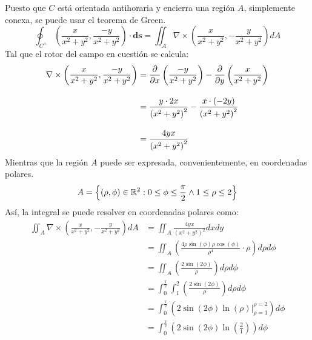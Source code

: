\begin{solution}
\begin{figure}[H]
    \end{figure}
    Puesto que $C$ está orientada antihoraria y encierra una región $A$, simplemente conexa, se puede usar el teorema de Green.
    \begin{equation*}
        \oint_{C^+} \left(\frac{x}{x^2+y^2},\frac{-y}{x^2+y^2}\right)\cdot\boldsymbol{ds} = \iint_{A} \nabla \times \left(\frac{x}{x^2+y^2},-\frac{y}{x^2+y^2}\right)dA
    \end{equation*}
    Tal que el rotor del campo en cuestión se calcula:
    \begin{align*}
        \nabla \times \left(\frac{x}{x^2+y^2},\frac{-y}{x^2+y^2}\right) &= \frac{\partial}{\partial x}\left(\frac{-y}{x^2+y^2}\right) - \frac{\partial}{\partial y}\left(\frac{x}{x^2+y^2}\right)\\[10pt]
        &= \frac{y\cdot2x}{\left(x^2+y^2\right)^2} - \frac{x\cdot(-2y)}{\left(x^2+y^2\right)^2}\\[10pt]
        &= \frac{4yx}{\left(x^2+y^2\right)^2}
    \end{align*}
    Mientras que la región $A$ puede ser expresada, convenientemente, en coordenadas polares.
    \begin{equation*}
        A=\left\{(\rho,\phi)\in\mathbb{R}^2:0\leq\phi\leq\frac{\pi}{2} \land 1\leq \rho \leq 2\right\}
    \end{equation*}
    Así, la integral se puede resolver en coordenadas polares como:
    \begin{align*}
        \iint_{A} \nabla \times \left(\frac{x}{x^2+y^2},-\frac{y}{x^2+y^2}\right)dA &= \iint_{A} \frac{4yx}{\left(x^2+y^2\right)^2}dxdy\\[10pt]
        &= \iint_{A}\left( \frac{4 \rho \sin{(\phi)} \rho \cos{(\phi)}}{\rho^4}\cdot \rho \right) d\rho d\phi\\[10pt]
        &= \iint_{A}\left( \frac{2 \sin{(2\phi)}}{\rho}\right) d\rho d\phi\\[10pt]
        &= \int^{\frac{\pi}{2}}_{0}\int^{2}_{1}\left( \frac{2 \sin{(2\phi)}}{\rho}\right) d\rho d\phi\\[10pt]
        &= \int^{\frac{\pi}{2}}_{0}\left(2\sin{(2\phi)}\left.\ln(\rho)\right|^{\rho=2}_{\rho=1}\right) d\phi\\[10pt]
        &= \int^{\frac{\pi}{2}}_{0}\left(2\sin{(2\phi)}\ln\left(\frac{2}{1}\right)\right) d\phi\\[10pt]

\end{align*}
\end{solution}
